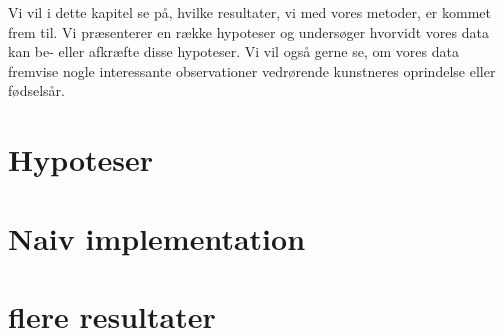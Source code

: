{
{\sffamily Vi vil i dette kapitel se på, hvilke resultater, vi med vores
metoder, er kommet frem til. Vi præsenterer en række hypoteser og
undersøger hvorvidt vores data kan be- eller afkræfte disse hypoteser.
Vi vil også gerne se, om vores data fremvise nogle interessante
observationer vedrørende kunstneres oprindelse eller fødselsår.
}

\section{Hypoteser}


\section{Naiv implementation\label{section_naiv_koersel}}

\clearpage

\section{flere resultater}

}
